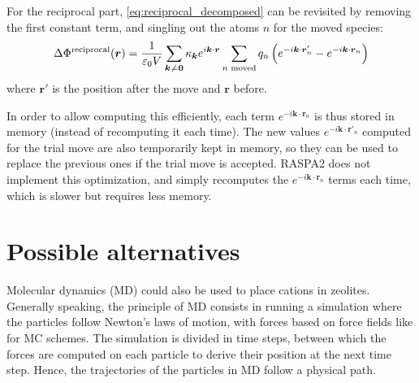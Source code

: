 \documentclass[main.tex]{subfiles}
\begin{document}
For the reciprocal part, \autoref{eq:reciprocal_decomposed} can be revisited by removing the first constant term, and singling out the atoms $n$ for the moved species:
\[\Delta\Phi^\text{reciprocal}(\boldsymbol{r}) = \frac1{\varepsilon_0V}\sum_{\boldsymbol{k}\not\kern0.2ex=\boldsymbol{0}} \kappa_{\boldsymbol k}e^{i\boldsymbol k\cdot\boldsymbol{r}} \sum_{n\text{ moved}}q_n\left(e^{-i\boldsymbol k\cdot\boldsymbol{r}'_n} - e^{-i\boldsymbol k\cdot\boldsymbol r_n}\right)\]
where $\boldsymbol{r}'$ is the position after the move and $\boldsymbol{r}$ before.

In order to allow computing this efficiently, each term $e^{-i\boldsymbol k\cdot\boldsymbol r_n}$ is thus stored in memory (instead of recomputing it each time). The new values $e^{-i\boldsymbol k\cdot\boldsymbol{r}'_n}$ computed for the trial move are also temporarily kept in memory, so they can be used to replace the previous ones if the trial move is accepted. RASPA2 does not implement this optimization, and simply recomputes the $e^{-i\boldsymbol k\cdot\boldsymbol r_n}$ terms each time, which is slower but requires less memory.



\section{Possible alternatives}

\label{metadynamics}

Molecular dynamics (MD) could also be used to place cations in zeolites. Generally speaking, the principle of MD consists in running a simulation where the particles follow Newton's laws of motion, with forces based on force fields like for MC schemes. The simulation is divided in time steps, between which the forces are computed on each particle to derive their position at the next time step. Hence, the trajectories of the particles in MD follow a physical path.
\end{document}
